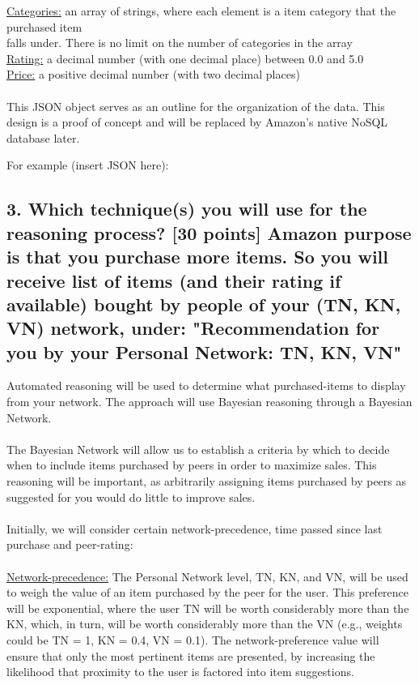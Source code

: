 \documentclass[12pt,a4paper]{article}
\begin{document}
		\underline{Categories:} an array of strings, where each element is a item category that the purchased item\\ falls under. There is no limit on the number of categories in the array\\
		\underline{Rating:} a decimal number (with one decimal place) between 0.0 and 5.0\\
		\underline{Price:} a positive decimal number (with two decimal places)\\
		\\
		This JSON object serves as an outline for the organization of the data. This design is a proof of concept and will be replaced by Amazon's native NoSQL database later.  
		
		For example (insert JSON here):
		
	\subsection*{3. Which technique(s) you will use for the reasoning process? [30 points] Amazon purpose is that you purchase more items. So you will receive list of items (and their rating if available) bought by people of your (TN, KN, VN) network, under: "Recommendation for you by your Personal Network: TN, KN, VN"}
		Automated reasoning will be used to determine what purchased-items to display from your network. The approach will use Bayesian reasoning through a Bayesian Network. 
		\\\\
		The Bayesian Network will allow us to establish a criteria by which to decide when to include items purchased by peers in order to maximize sales. This reasoning will be important, as arbitrarily assigning items purchased by peers as suggested for you would do little to improve sales. 
		\\\\
		Initially, we will consider certain network-precedence, time passed since last purchase and peer-rating: 
		\\\\
		\underline{Network-precedence:} The Personal Network level, TN, KN, and VN, will be used to weigh the value of an item purchased by the peer for the user. This preference will be exponential, where the user TN will be worth considerably more than the KN, which, in turn, will be worth considerably more than the VN (e.g., weights could be TN = 1, KN = 0.4, VN = 0.1). The network-preference value will ensure that only the most pertinent items are presented, by increasing the likelihood that proximity to the user is factored into item suggestions. 
\end{document}
